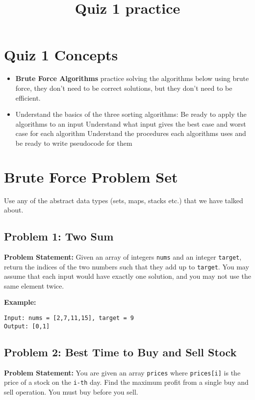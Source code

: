 \documentclass[12pt]{article}
\title{Quiz 1 practice}
\date{}
\begin{document}
\section*{Quiz 1 Concepts}
\begin{itemize}
  \item \textbf{Brute Force Algorithms} practice solving the algorithms below using brute force, they don't need to be correct solutions, but they don't need to be efficient.
  \item Understand the basics of the three sorting algorithms:\newline
Be ready to apply the algorithms to an input\newline
Understand what input gives the best case and worst case for each algorithm\newline
Understand the procedures each algorithms uses and be ready to write pseudocode for them
\end{itemize}

\section*{Brute Force Problem Set}
Use any of the abstract data types (sets, maps, stacks etc.) that we have talked about.
\subsection*{Problem 1: Two Sum}
\textbf{Problem Statement:} Given an array of integers \texttt{nums} and an integer \texttt{target}, return the indices of the two numbers such that they add up to \texttt{target}. You may assume that each input would have exactly one solution, and you may not use the same element twice.

\textbf{Example:}
\begin{verbatim}
Input: nums = [2,7,11,15], target = 9
Output: [0,1]
\end{verbatim}


\vspace{1cm}

\subsection*{Problem 2: Best Time to Buy and Sell Stock}
\textbf{Problem Statement:} You are given an array \texttt{prices} where \texttt{prices[i]} is the price of a stock on the \texttt{i-th} day. Find the maximum profit from a single buy and sell operation. You must buy before you sell.
\end{document}
